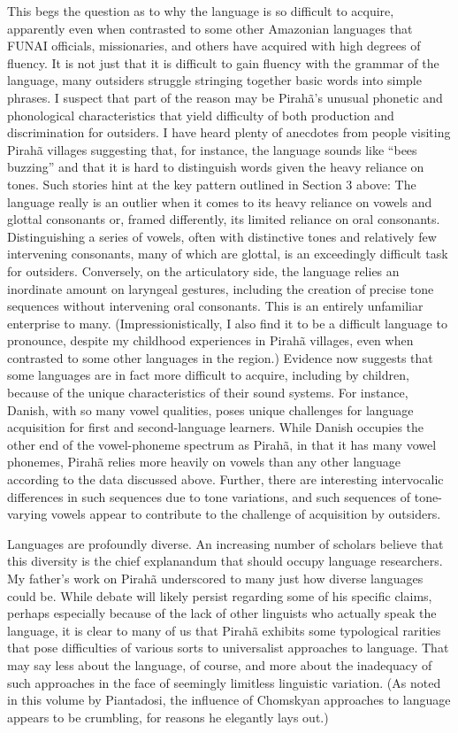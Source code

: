 \documentclass[output=paper,colorlinks,citecolor=brown
]{langscibook}
\begin{document}
    This begs the question as to why the language is so difficult to acquire, apparently even when contrasted to some other Amazonian languages that FUNAI officials, missionaries, and others have acquired with high degrees of fluency. It is not just that it is difficult to gain fluency with the grammar of the language, many outsiders struggle stringing together basic words into simple phrases. I suspect that part of the reason may be Pirahã’s unusual phonetic and phonological characteristics that yield difficulty of both production and discrimination for outsiders. I have heard plenty of anecdotes from people visiting Pirahã villages suggesting that, for instance, the language sounds like “bees buzzing” and that it is hard to distinguish words given the heavy reliance on tones. Such stories hint at the key pattern outlined in Section 3 above: The language really is an outlier when it comes to its heavy reliance on vowels and glottal consonants or, framed differently, its limited reliance on oral consonants. Distinguishing a series of vowels, often with distinctive tones and relatively few intervening consonants, many of which are glottal, is an exceedingly difficult task for outsiders. Conversely, on the articulatory side, the language relies an inordinate amount on laryngeal gestures, including the creation of precise tone sequences without intervening oral consonants. This is an entirely unfamiliar enterprise to many. (Impressionistically, I also find it to be a difficult language to pronounce, despite my childhood experiences in Pirahã villages, even when contrasted to some other languages in the region.) Evidence now suggests that some languages are in fact more difficult to acquire, including by children, because of the unique characteristics of their sound systems. For instance, Danish, with so many vowel qualities, poses unique challenges for language acquisition for first and second-language learners.\cite{trecca2021danish} While Danish occupies the other end of the vowel-phoneme spectrum as Pirahã, in that it has many vowel phonemes, Pirahã relies more heavily on vowels than any other language according to the data discussed above. Further, there are interesting intervocalic differences in such sequences due to tone variations, and such sequences of tone-varying vowels appear to contribute to the challenge of acquisition by outsiders.
    
    Languages are profoundly diverse. An increasing number of scholars believe that this diversity is the chief explanandum that should occupy language researchers.\cite{evans2009myth} My father’s work on Pirahã underscored to many just how diverse languages could be. While debate will likely persist regarding some of his specific claims, perhaps especially because of the lack of other linguists who actually speak the language, it is clear to many of us that Pirahã exhibits some typological rarities that pose difficulties of various sorts to universalist approaches to language. That may say less about the language, of course, and more about the inadequacy of such approaches in the face of seemingly limitless linguistic variation. (As noted in this volume by Piantadosi, the influence of Chomskyan approaches to language appears to be crumbling, for reasons he elegantly lays out.) 
    
\end{document}
